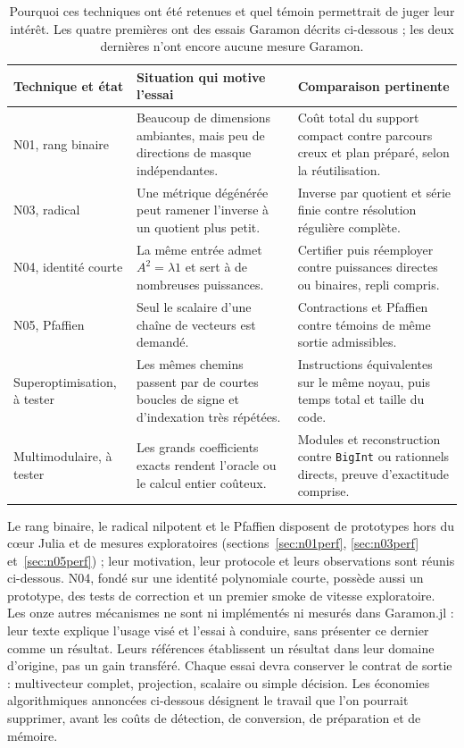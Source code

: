 \documentclass[11pt,a4paper]{article}
\newcommand{\code}[1]{\texttt{#1}}
\begin{document}
\begin{table}[ht]
\centering\small
\begin{tabularx}{\linewidth}{@{}p{30mm}X X@{}}
\toprule
Technique et état & Situation qui motive l'essai & Comparaison pertinente \\
\midrule
N01, rang binaire & Beaucoup de dimensions ambiantes, mais peu de directions de masque indépendantes. & Coût total du support compact contre parcours creux et plan préparé, selon la réutilisation. \\
N03, radical & Une métrique dégénérée peut ramener l'inverse à un quotient plus petit. & Inverse par quotient et série finie contre résolution régulière complète. \\
N04, identité courte & La même entrée admet $A^2=\lambda1$ et sert à de nombreuses puissances. & Certifier puis réemployer contre puissances directes ou binaires, repli compris. \\
N05, Pfaffien & Seul le scalaire d'une chaîne de vecteurs est demandé. & Contractions et Pfaffien contre témoins de même sortie admissibles. \\
Superoptimisation, à tester & Les mêmes chemins passent par de courtes boucles de signe et d'indexation très répétées. & Instructions équivalentes sur le même noyau, puis temps total et taille du code. \\
Multimodulaire, à tester & Les grands coefficients exacts rendent l'oracle ou le calcul entier coûteux. & Modules et reconstruction contre \code{BigInt} ou rationnels directs, preuve d'exactitude comprise. \\
\bottomrule
\end{tabularx}
\caption{Pourquoi ces techniques ont été retenues et quel témoin permettrait
de juger leur intérêt. Les quatre premières ont des essais Garamon décrits
ci-dessous ; les deux dernières n'ont encore aucune mesure Garamon.}
\label{tab:questionsstructurelles}
\end{table}

Le rang binaire, le radical nilpotent et le Pfaffien disposent de
prototypes hors du cœur Julia et de mesures exploratoires
(sections~\ref{sec:n01perf}, \ref{sec:n03perf} et~\ref{sec:n05perf}) ;
leur motivation, leur protocole et leurs observations sont réunis
ci-dessous. N04, fondé sur une identité polynomiale courte, possède aussi
un prototype, des tests de correction et un premier smoke de vitesse
exploratoire.
Les onze autres mécanismes ne sont ni implémentés ni mesurés dans
Garamon.jl : leur texte explique l'usage visé et l'essai à conduire,
sans présenter ce dernier comme un résultat. Leurs références
établissent un résultat dans leur domaine d'origine, pas un gain transféré.
Chaque essai devra conserver le contrat de sortie : multivecteur complet,
projection, scalaire ou simple décision. Les économies algorithmiques
annoncées ci-dessous désignent le travail que l'on pourrait supprimer,
avant les coûts de détection, de conversion, de préparation et de mémoire.
\end{document}
